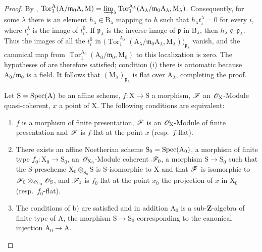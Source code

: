 \begin{proof}
By , $\operatorname{Tor}_1^\mathrm A
(\mathrm A/\mathfrak m_0\mathrm A,\mathrm M)
=\varinjlim_\lambda
\operatorname{Tor}_1^{\mathrm A_\lambda}
(\mathrm A_\lambda/\mathfrak m_0\mathrm A_\lambda,
\mathrm M_\lambda)$.
Consequently, for some $\lambda$ there is an element
$h_\lambda\in\mathrm B_\lambda$ mapping to $h$ such that
$h_\lambda t_i^\lambda=0$ for every $i$, where $t_i^\lambda$ is the
image of $t_i^0$. If $\mathfrak p_\lambda$ is the inverse image of
$\mathfrak p$ in $\mathrm B_\lambda$, then
$h_\lambda\notin\mathfrak p_\lambda$. Thus the images of all the
$t_i^0$ in $\bigl(\operatorname{Tor}_1^{\mathrm A_\lambda}
(\mathrm A_\lambda/\mathfrak m_0\mathrm A_\lambda,
\mathrm M_\lambda)\bigr)_{\mathfrak p_\lambda}$
vanish, and the canonical map from
$\operatorname{Tor}_1^{\mathrm A_0}
(\mathrm A_0/\mathfrak m_0,\mathrm M_0)$ to this localization is zero.
The hypotheses of  are therefore satisfied; condition
(i) there is automatic because $\mathrm A_0/\mathfrak m_0$ is a field.
It follows that $(\mathrm M_\lambda)_{\mathfrak p_\lambda}$ is flat
over $\mathrm A_\lambda$, completing the proof.

\begin{corollary}[11.2.7]
\label{IV.11.2.7}
Let $\mathrm{S}=\operatorname{Spec}(\mathrm{A})$ be an affine scheme, $f:\mathrm{X}\to\mathrm{S}$ a morphism, $\mathscr{F}$ an $\mathscr{O}_\mathrm{X}$-Module quasi-coherent, $x$ a point of $\mathrm{X}$. The following conditions are equivalent:
\begin{enumerate}[label=\emph{\alph*)}]
  \item $f$ is a morphism of finite presentation, $\mathscr{F}$ is an $\mathscr{O}_\mathrm{X}$-Module of finite presentation and $\mathscr{F}$ is $f$-flat at the point $x$ (\textup{resp.}\ $f$-flat).
  \item There exists an affine \textup{Noetherian} scheme $\mathrm{S}_0=\operatorname{Spec}(\mathrm{A}_0)$, a morphism of finite type $f_0:\mathrm{X}_0\to\mathrm{S}_0$, an $\mathscr{O}_{\mathrm{X}_0}$-Module coherent $\mathscr{F}_0$, a morphism $\mathrm{S}\to\mathrm{S}_0$ such that the S-prescheme $\mathrm{X}_0\otimes_{\mathrm{S}_0}\mathrm{S}$ is S-isomorphic to $\mathrm{X}$ and that $\mathscr{F}$ is isomorphic to $\mathscr{F}_0\otimes_{\mathscr{O}_{\mathrm{S}_0}}\mathscr{O}_\mathrm{S}$, and $\mathscr{F}_0$ is $f_0$-flat at the point $x_0$ the projection of $x$ in $\mathrm{X}_0$ (\textup{resp.}\ $f_0$-flat).
  \item The conditions of \textup{b)} are satisfied and in addition $\mathrm{A}_0$ is a sub-$\mathbf{Z}$-algebra of finite type of $\mathrm{A}$, the morphism $\mathrm{S}\to\mathrm{S}_0$ corresponding to the canonical injection $\mathrm{A}_0\to\mathrm{A}$.
\end{enumerate}
\end{corollary}


\end{proof}
